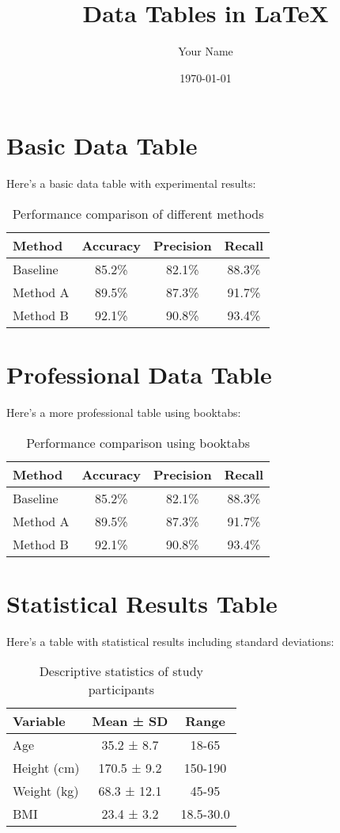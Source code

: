 \documentclass{article}
\title{Data Tables in LaTeX}
\author{Your Name}
\date{\today}
\begin{document}
\maketitle

\section{Basic Data Table}
Here's a basic data table with experimental results:

\begin{table}[h]
\centering
\begin{tabular}{|l|c|c|c|}
\hline
\textbf{Method} & \textbf{Accuracy} & \textbf{Precision} & \textbf{Recall} \\
\hline
Baseline & 85.2\% & 82.1\% & 88.3\% \\
Method A & 89.5\% & 87.3\% & 91.7\% \\
Method B & 92.1\% & 90.8\% & 93.4\% \\
\hline
\end{tabular}
\caption{Performance comparison of different methods}
\label{tab:performance}
\end{table}

\section{Professional Data Table}
Here's a more professional table using booktabs:

\begin{table}[h]
\centering
\begin{tabular}{lccc}
\toprule
Method & Accuracy & Precision & Recall \\
\midrule
Baseline & 85.2\% & 82.1\% & 88.3\% \\
Method A & 89.5\% & 87.3\% & 91.7\% \\
Method B & 92.1\% & 90.8\% & 93.4\% \\
\bottomrule
\end{tabular}
\caption{Performance comparison using booktabs}
\label{tab:booktabs}
\end{table}

\section{Statistical Results Table}
Here's a table with statistical results including standard deviations:

\begin{table}[h]
\centering
\begin{tabular}{lcc}
\toprule
\textbf{Variable} & \textbf{Mean ± SD} & \textbf{Range} \\
\midrule
Age & 35.2 ± 8.7 & 18-65 \\
Height (cm) & 170.5 ± 9.2 & 150-190 \\
Weight (kg) & 68.3 ± 12.1 & 45-95 \\
BMI & 23.4 ± 3.2 & 18.5-30.0 \\
\bottomrule
\end{tabular}
\caption{Descriptive statistics of study participants}
\label{tab:stats}
\end{table}
\end{document}
